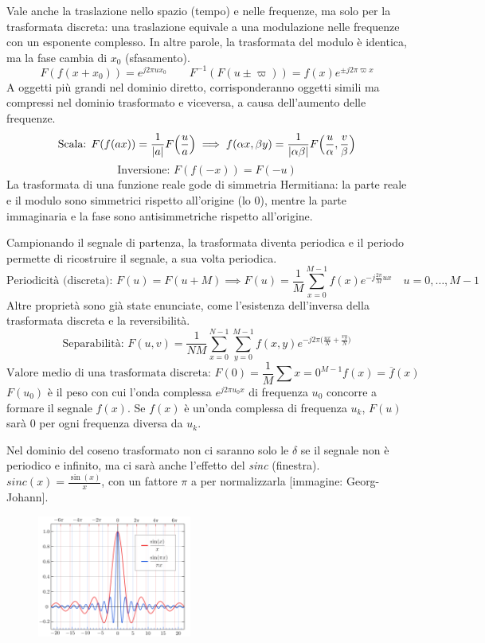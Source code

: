Vale anche la traslazione nello spazio (tempo) e nelle frequenze, ma solo per la trasformata discreta: una traslazione equivale a una modulazione nelle frequenze con un esponente complesso. In altre parole, la trasformata del modulo è identica, ma la fase cambia di $x_0$ (sfasamento).
$$F(f(x + x_0)) = e^{j2\pi ux_0} \qquad F^{-1}(F(u \pm \varpi)) = f(x)e^{\pm j2\pi \varpi x}$$
A oggetti più grandi nel dominio diretto, corrisponderanno oggetti simili ma compressi nel dominio trasformato e viceversa, a causa dell'aumento delle frequenze. 
$$\text{Scala: } F(f(ax)) = \frac{1}{\left|a\right|} F\Big(\frac{u}{a}\Big) \implies f(\alpha x, \beta y) = \frac{1}{\left|\alpha \beta\right|} F\Big(\frac{u}{\alpha}, \frac{v}{\beta}\Big)$$
$$\text{Inversione: } F(f(-x)) = F(-u)$$
La trasformata di una funzione reale gode di simmetria Hermitiana: la parte reale e il modulo sono simmetrici rispetto all'origine (lo 0), mentre la parte immaginaria e la fase sono antisimmetriche rispetto all'origine.

Campionando il segnale di partenza, la trasformata diventa periodica e il periodo permette di ricostruire il segnale, a sua volta periodica. 
$$\text{Periodicità (discreta): } F(u) = F(u + M) \implies F(u) = \frac{1}{M} \sum_{x=0}^{M-1} f(x)e^{-j\frac{2\pi}{M}ux} \quad u = 0, \dots, M - 1$$
Altre proprietà sono già state enunciate, come l'esistenza dell'inversa della trasformata discreta e la reversibilità.
$$\text{Separabilità: } F(u, v) = \frac{1}{NM} \sum_{x=0}^{N-1} \sum_{y=0}^{M-1} f(x, y) e^{-j2\pi \big(\frac{ux}{N} + \frac{vy}{N}\big)}$$
$$\text{Valore medio di una trasformata discreta: } F(0) = \frac{1}{M} \sum{x=0}^{M-1} f(x) = \overline{f}(x)$$
$F(u_0)$ è il peso con cui l'onda complessa $e^{j2\pi u_0x}$ di frequenza $u_0$ concorre a formare il segnale $f(x)$. Se $f(x)$ è un'onda complessa di frequenza $u_k$, $F(u)$ sarà 0 per ogni frequenza diversa da $u_k$.

Nel dominio del coseno trasformato non ci saranno solo le $\delta$ se il segnale non è periodico e infinito, ma ci sarà anche l'effetto del \textit{sinc} (finestra). $sinc(x) = \frac{\sin(x)}{x}$, con un fattore $\pi$ a per normalizzarla [immagine: Georg-Johann]. 

\begin{figure}
	\vspace{-15pt}
	\includegraphics[width=0.45\textwidth]{Lezioni/Immagini/sinc.png}
	\vspace{-30pt}
\end{figure}

